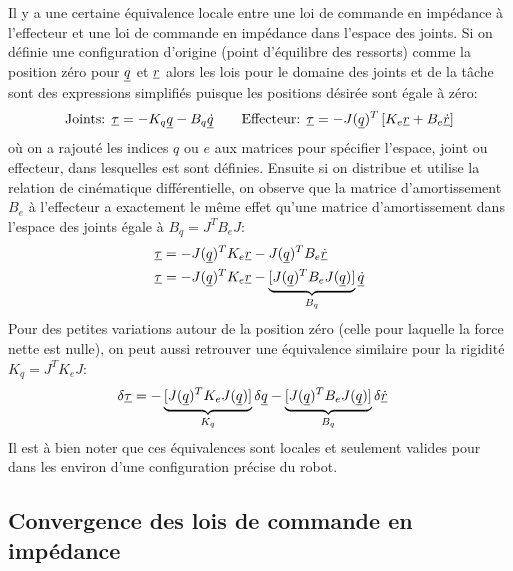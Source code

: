 Il y a une certaine équivalence locale entre une loi de commande en impédance à l'effecteur et une loi de commande en impédance dans l'espace des joints. Si on définie une configuration d'origine (point d'équilibre des ressorts) comme la position zéro pour $\underline{q}$ et $\underline{r}$ alors les lois pour le domaine des joints et de la tâche sont des expressions simplifiés puisque les positions désirée sont égale à zéro: 
\begin{align}
\text{Joints: }
\underline{\tau} = - K_q \underline{q} - B_q \underline{\dot{q}}
\quad\quad
\text{Effecteur: }
\underline{\tau} = - J(\underline{q})^T   \left[ K_e \underline{r} + B_e \underline{\dot{r}} \right] 
\end{align}
où on a rajouté les indices $q$ ou $e$ aux matrices pour spécifier l'espace, joint ou effecteur, dans lesquelles est sont définies. Ensuite si on distribue et utilise la relation de cinématique différentielle, on observe que la matrice d'amortissement $B_e$ à l'effecteur a exactement le même effet qu'une matrice d'amortissement dans l'espace des joints égale à $B_q = J^T B_e J$:
\begin{align}
\underline{\tau} &= - J(\underline{q})^T   K_e \underline{r} - J(\underline{q})^T B_e \underline{\dot{r}} \\
\underline{\tau} &= - J(\underline{q})^T   K_e \underline{r} - \underbrace{ [ J(\underline{q})^T   B_e  J(\underline{q}) ] }_{ B_q } \underline{\dot{q}}
\end{align}
Pour des petites variations autour de la position zéro (celle pour laquelle la force nette est nulle), on peut aussi retrouver une équivalence similaire pour la rigidité $K_q = J^T K_e J$:
\begin{align}
\delta \underline{\tau} &= - \underbrace{ [ J(\underline{q})^T   K_e  J(\underline{q}) ] }_{ K_q }
\delta \underline{q} - \underbrace{ [ J(\underline{q})^T   B_e  J(\underline{q}) ] }_{ B_q }\delta \underline{\dot{r}}
\end{align}
Il est à bien noter que ces équivalences sont locales et seulement valides pour dans les environ d'une configuration précise du robot. 

\subsection{Convergence des lois de commande en impédance}
\label{sec:impcontrolconvergence}


